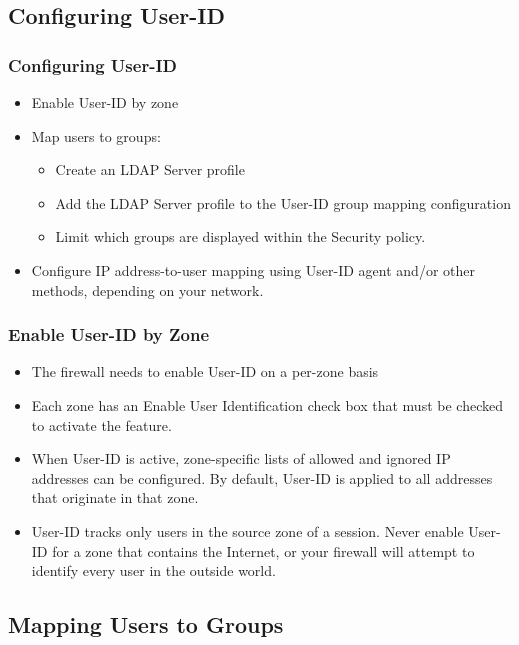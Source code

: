 \subsection{Configuring User-ID}
\subsubsection{Configuring User-ID}
\begin{itemize}
    \item Enable User-ID by zone
    \item Map users to groups:
        \begin{itemize}
            \item Create an LDAP Server profile
            \item Add the LDAP Server profile to the User-ID group mapping configuration
            \item Limit which groups are displayed within the Security policy.
        \end{itemize}
    \item Configure IP address-to-user mapping using User-ID agent and/or other methods, depending on your network.
\end{itemize}

\subsubsection{Enable User-ID by Zone}
\begin{itemize}
    \item The firewall needs to enable User-ID on a per-zone basis
    \item Each zone has an Enable User Identification check box that must be checked to activate the feature.
    \item When User-ID is active, zone-specific lists of allowed and ignored IP addresses can be configured. By default, User-ID is applied to all addresses that originate in that zone.
    \item User-ID tracks only users in the source zone of a session. Never enable User-ID for a zone that contains the Internet, or your firewall will attempt to identify every user in the outside world.
\end{itemize}

\subsection{Mapping Users to Groups}
